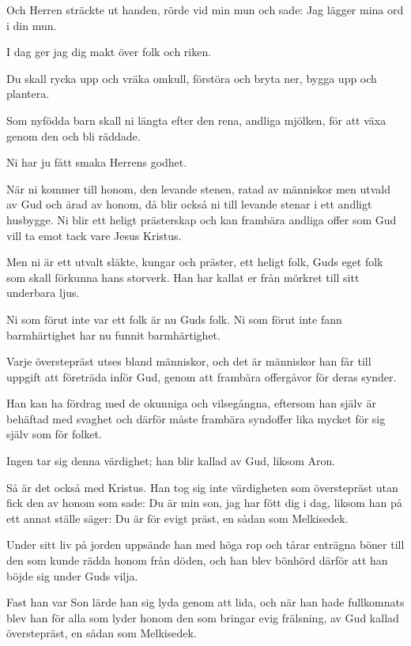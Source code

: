 Och Herren sträckte ut handen, rörde vid min mun och sade:
Jag lägger mina ord i din mun.

I dag ger jag dig makt
över folk och riken.

Du skall rycka upp och vräka omkull,
förstöra och bryta ner,
bygga upp och plantera.


{Som nyfödda barn skall ni längta efter den rena, andliga mjölken, för att växa genom den och bli räddade.}

Ni har ju fått smaka Herrens godhet.

När ni kommer till honom, den levande stenen, ratad av människor men utvald av Gud och ärad av honom,
då blir också ni till levande stenar i ett andligt husbygge. Ni blir ett heligt prästerskap och kan frambära andliga offer som Gud vill ta emot tack vare Jesus Kristus.

Men ni är ett utvalt släkte, kungar och präster, ett heligt folk, Guds eget folk som skall förkunna hans storverk. Han har kallat er från mörkret till sitt underbara ljus.

Ni som förut inte var ett folk är nu Guds folk. Ni som förut inte fann barmhärtighet har nu funnit barmhärtighet.


{Varje överstepräst utses bland människor, och det är människor han får till uppgift att företräda inför Gud, genom att frambära offergåvor för deras synder.}

Han kan ha fördrag med de okunniga och vilsegångna, eftersom han själv är behäftad med svaghet
och därför måste frambära syndoffer lika mycket för sig själv som för folket.

Ingen tar sig denna värdighet; han blir kallad av Gud, liksom Aron.

Så är det också med Kristus. Han tog sig inte värdigheten som överstepräst utan fick den av honom som sade: Du är min son, jag har fött dig i dag,
liksom han på ett annat ställe säger: Du är för evigt präst, en sådan som Melkisedek.

Under sitt liv på jorden uppsände han med höga rop och tårar enträgna böner till den som kunde rädda honom från döden, och han blev bönhörd därför att han böjde sig under Guds vilja.

Fast han var Son lärde han sig lyda genom att lida,
och när han hade fullkomnats blev han för alla som lyder honom den som bringar evig frälsning,
av Gud kallad överstepräst, en sådan som Melkisedek.


